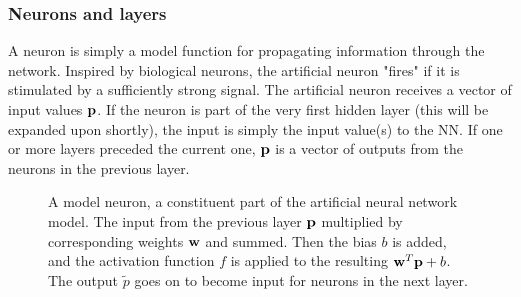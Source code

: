 \documentclass[a4paper, twocolumn]{article}
\begin{document}
\subsubsection{Neurons and layers}
A neuron is simply a model function for propagating information through the network. Inspired by biological neurons, the artificial neuron "fires" if it is stimulated by a sufficiently strong signal. The artificial neuron receives a vector of input values ${\bf p}$. If the neuron is part of the very first hidden layer (this will be expanded upon shortly), the input is simply the input value(s) to the NN. If one or more layers preceded the current one, ${\bf p}$ is a vector of outputs from the neurons in the previous layer.

\begin{figure}
\begin{centering}
\caption{A model neuron, a constituent part of the artificial neural network model. The input from the previous layer ${\bf p}$ multiplied by corresponding weights ${\bf w}$ and summed. Then the bias $b$ is added, and the activation function $f$ is applied to the resulting ${\bf w}^T{\bf p}+b$. The output $\tilde p$ goes on to become input for neurons in the next layer. \label{fig:neuron}}
\end{centering}
\end{figure}
\end{document}
